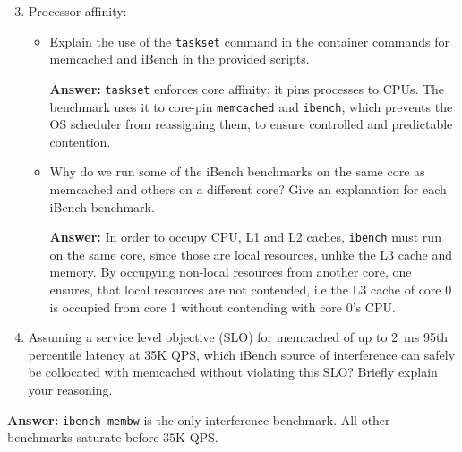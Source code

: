 
\begin{enumerate}[label=(\alph*)]
    \setcounter{enumi}{2}
    \item Processor affinity:
    \begin{itemize}
        \item Explain the use of the \texttt{taskset} command in the container commands for memcached and iBench in the provided scripts.
        
        \textbf{Answer:} \texttt{taskset} enforces core affinity; it pins processes to CPUs. The benchmark uses it to core-pin \texttt{memcached} and \texttt{ibench}, which prevents the OS scheduler from reassigning them, to ensure controlled and predictable contention.
        \\

        \item Why do we run some of the iBench benchmarks on the same core as memcached and others on a different core? Give an explanation for each iBench benchmark.

        \textbf{Answer:} In order to occupy CPU, L1 and L2 caches, \texttt{ibench} must run on the same core, since those are local resources, unlike the L3 cache and memory. By occupying non-local resources from another core, one ensures, that local resources are not contended, i.e the L3 cache of core 0 is occupied from core 1 without contending with core 0's CPU. 
    \end{itemize}
    
\end{enumerate}

    
\begin{enumerate}[label=(\alph*)]
    \setcounter{enumi}{3}
    
    \item Assuming a service level objective (SLO) for memcached of up to 2~ms 95th percentile latency at 35K QPS, which iBench source of interference can safely be collocated with memcached without violating this SLO? Briefly explain your reasoning.
            
\end{enumerate}

\textbf{Answer:} \texttt{ibench-membw} is the only interference benchmark. All other benchmarks saturate before $35$K QPS.

    
